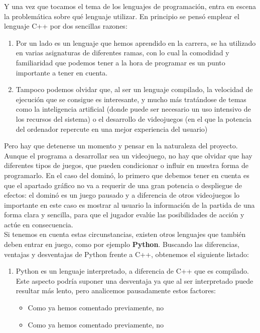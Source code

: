 Y una vez que tocamos el tema de los lenguajes de programación, entra en escena la problemática sobre qué lenguaje
utilizar. En principio se pensó emplear el lenguaje C++ por dos sencillas razones:

\begin{enumerate}
    \item Por un lado es un lenguaje que hemos aprendido en la carrera, se ha utilizado en varias asignaturas de
            diferentes ramas, con lo cual la comodidad y familiaridad que podemos tener a la hora de programar
            es un punto importante a tener en cuenta.
    \item Tampoco podemos olvidar que, al ser un lenguaje compilado, la velocidad de ejecución que se consigue
            es interesante, y mucho más tratándose de temas como la inteligencia artificial (donde puede ser
            necesario un uso intensivo de los recursos del sistema) o el desarrollo de videojuegos (en el que
            la potencia del ordenador repercute en una mejor experiencia del usuario)
\end{enumerate}

Pero hay que detenerse un momento y pensar en la naturaleza del proyecto. Aunque el programa a desarrollar sea un
videojuego, no hay que olvidar que hay diferentes tipos de juegos, que pueden condicionar o influir en nuestra forma
de programarlo. En el caso del dominó, lo primero que debemos tener en cuenta es que el apartado gráfico no va a
requerir de una gran potencia o despliegue de efectos: el dominó es un juego pausado y a diferencia de otros
videojuegos lo importante en este caso es mostrar al usuario la información de la partida de una forma clara y sencilla,
para que el jugador evalúe las posibilidades de acción y actúe en consecuencia.\\

Si tenemos en cuenta estas circunstancias, existen otros lenguajes que también deben entrar en juego,
como por ejemplo \textbf{Python}. Buscando las diferencias, ventajas y desventajas de Python frente a C++,
obtenemos el siguiente listado:

\begin{enumerate}
    \item Python es un lenguaje interpretado, a diferencia de C++ que es compilado. Este aspecto podría suponer una
            desventaja  ya que al ser interpretado puede resultar más lento, pero analicemos pausadamente estos
            factores:
        \begin{itemize}
            \item Como ya hemos comentado previamente, no
            \item Como ya hemos comentado previamente, no
        \end{itemize}
\end{enumerate}
